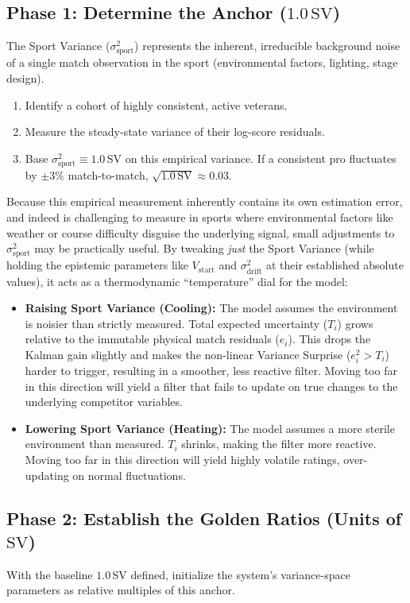\documentclass[12pt]{article}
\begin{document}
	\subsection{Phase 1: Determine the Anchor ($1.0\,\mathrm{SV}$)}
	The Sport Variance ($\sigma_{\mathrm{sport}}^2$) represents the inherent, irreducible background noise of a single match observation in the sport (environmental factors, lighting, stage design).
	\begin{enumerate}
		\item Identify a cohort of highly consistent, active veterans.
		\item Measure the steady-state variance of their log-score residuals.
		\item Base $\sigma_{\mathrm{sport}}^2 \equiv 1.0\,\mathrm{SV}$ on this empirical variance. If a consistent pro fluctuates by $\pm 3\%$ match-to-match, $\sqrt{1.0\,\mathrm{SV}} \approx 0.03$.
	\end{enumerate}

	Because this empirical measurement inherently contains its own estimation error, and indeed is challenging to measure in sports where environmental factors like weather or course difficulty disguise the underlying signal, small adjustments to $\sigma_{\mathrm{sport}}^2$ may be practically useful. By tweaking \emph{just} the Sport Variance (while holding the epistemic parameters like $V_{\mathrm{start}}$ and $\sigma_{\mathrm{drift}}^2$ at their established absolute values), it acts as a thermodynamic ``temperature'' dial for the model:
	\begin{itemize}
		\item \textbf{Raising Sport Variance (Cooling):} The model assumes the environment is noisier than strictly measured. Total expected uncertainty ($T_i$) grows relative to the immutable physical match residuals ($e_i$). This drops the Kalman gain slightly and makes the non-linear Variance Surprise ($e_i^2 > T_i$) harder to trigger, resulting in a smoother, less reactive filter. Moving too far in this direction will yield a filter that fails to update on true changes to the underlying competitor variables.
		\item \textbf{Lowering Sport Variance (Heating):} The model assumes a more sterile environment than measured. $T_i$ shrinks, making the filter more reactive. Moving too far in this direction will yield highly volatile ratings, over-updating on normal fluctuations.
	\end{itemize}

	\subsection{Phase 2: Establish the Golden Ratios (Units of $\mathrm{SV}$)}
	With the baseline $1.0\,\mathrm{SV}$ defined, initialize the system's variance-space parameters as relative multiples of this anchor.
\end{document}
